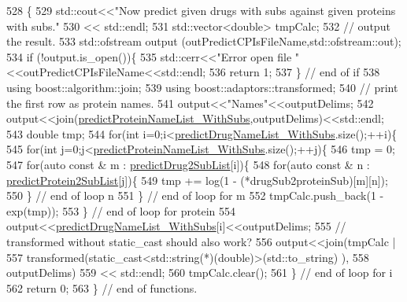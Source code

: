 \begin{DoxyCode}
528                                               \{
529     std::cout<<\textcolor{stringliteral}{"Now predict given drugs with subs against given proteins with subs."}
530              << std::endl;
531     std::vector<double> tmpCalc;
532     \textcolor{comment}{// output the result.}
533     std::ofstream output (outPredictCPIsFileName,std::ofstream::out);
534     \textcolor{keywordflow}{if} (!output.is\_open())\{
535       std::cerr<<\textcolor{stringliteral}{"Error open file "}<<outPredictCPIsFileName<<std::endl;
536       \textcolor{keywordflow}{return} 1;
537     \} \textcolor{comment}{// end of if}
538     \textcolor{keyword}{using} boost::algorithm::join;
539     \textcolor{keyword}{using} boost::adaptors::transformed;
540     \textcolor{comment}{// print the first row as protein names.}
541     output<<\textcolor{stringliteral}{"Names"}<<outputDelims;
542     output<<join(\hyperlink{namespacegift_a03aaa96d826b6a887accc3951939ccde}{predictProteinNameList\_WithSubs},outputDelims)<<std::endl;
543     \textcolor{keywordtype}{double} tmp;
544     \textcolor{keywordflow}{for}(\textcolor{keywordtype}{int} i=0;i<\hyperlink{namespacegift_a85bd1982c5b60a7cf09a0f80398bb051}{predictDrugNameList\_WithSubs}.size();++i)\{
545       \textcolor{keywordflow}{for}(\textcolor{keywordtype}{int} j=0;j<\hyperlink{namespacegift_a03aaa96d826b6a887accc3951939ccde}{predictProteinNameList\_WithSubs}.size();++j)\{
546         tmp = 0;
547         \textcolor{keywordflow}{for}(\textcolor{keyword}{auto} \textcolor{keyword}{const} & m : \hyperlink{namespacegift_a00bda5cc17262f36063eed0fbf03459c}{predictDrug2SubList}[i])\{
548           \textcolor{keywordflow}{for}(\textcolor{keyword}{auto} \textcolor{keyword}{const} & n : \hyperlink{namespacegift_a4899f631bc8342759f4096e7b653eed8}{predictProtein2SubList}[j])\{
549             tmp += log(1 - (*drugSub2proteinSub)[m][n]);
550           \} \textcolor{comment}{// end of loop n}
551         \} \textcolor{comment}{// end of loop for m}
552         tmpCalc.push\_back(1 - exp(tmp));
553       \} \textcolor{comment}{// end of loop for protein}
554       output<<\hyperlink{namespacegift_a85bd1982c5b60a7cf09a0f80398bb051}{predictDrugNameList\_WithSubs}[i]<<outputDelims;
555       \textcolor{comment}{// transformed without static\_cast should also work?}
556       output<<join(tmpCalc |
557               transformed(\textcolor{keyword}{static\_cast<}std::string(*)(\textcolor{keywordtype}{double})\textcolor{keyword}{>}(std::to\_string) ),
558                    outputDelims)
559             << std::endl;
560       tmpCalc.clear();
561     \} \textcolor{comment}{// end of loop for i}
562     \textcolor{keywordflow}{return} 0;
563   \} \textcolor{comment}{// end of functions.}
\end{DoxyCode}
